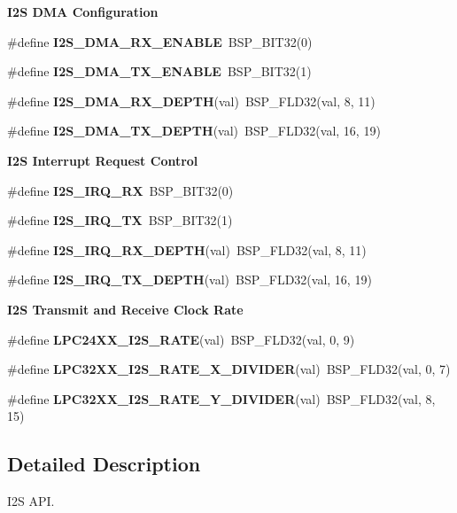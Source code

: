 \begin{Indent}\textbf{ I2S D\+MA Configuration}\par
\begin{DoxyCompactItemize}
\item 
\#define {\bfseries I2\+S\+\_\+\+D\+M\+A\+\_\+\+R\+X\+\_\+\+E\+N\+A\+B\+LE}~B\+S\+P\+\_\+\+B\+I\+T32(0)
\item 
\#define {\bfseries I2\+S\+\_\+\+D\+M\+A\+\_\+\+T\+X\+\_\+\+E\+N\+A\+B\+LE}~B\+S\+P\+\_\+\+B\+I\+T32(1)
\item 
\#define {\bfseries I2\+S\+\_\+\+D\+M\+A\+\_\+\+R\+X\+\_\+\+D\+E\+P\+TH}(val)~B\+S\+P\+\_\+\+F\+L\+D32(val, 8, 11)
\item 
\#define {\bfseries I2\+S\+\_\+\+D\+M\+A\+\_\+\+T\+X\+\_\+\+D\+E\+P\+TH}(val)~B\+S\+P\+\_\+\+F\+L\+D32(val, 16, 19)
\end{DoxyCompactItemize}
\end{Indent}
\begin{Indent}\textbf{ I2S Interrupt Request Control}\par
\begin{DoxyCompactItemize}
\item 
\#define {\bfseries I2\+S\+\_\+\+I\+R\+Q\+\_\+\+RX}~B\+S\+P\+\_\+\+B\+I\+T32(0)
\item 
\#define {\bfseries I2\+S\+\_\+\+I\+R\+Q\+\_\+\+TX}~B\+S\+P\+\_\+\+B\+I\+T32(1)
\item 
\#define {\bfseries I2\+S\+\_\+\+I\+R\+Q\+\_\+\+R\+X\+\_\+\+D\+E\+P\+TH}(val)~B\+S\+P\+\_\+\+F\+L\+D32(val, 8, 11)
\item 
\#define {\bfseries I2\+S\+\_\+\+I\+R\+Q\+\_\+\+T\+X\+\_\+\+D\+E\+P\+TH}(val)~B\+S\+P\+\_\+\+F\+L\+D32(val, 16, 19)
\end{DoxyCompactItemize}
\end{Indent}
\begin{Indent}\textbf{ I2S Transmit and Receive Clock Rate}\par
\begin{DoxyCompactItemize}
\item 
\#define {\bfseries L\+P\+C24\+X\+X\+\_\+\+I2\+S\+\_\+\+R\+A\+TE}(val)~B\+S\+P\+\_\+\+F\+L\+D32(val, 0, 9)
\item 
\#define {\bfseries L\+P\+C32\+X\+X\+\_\+\+I2\+S\+\_\+\+R\+A\+T\+E\+\_\+\+X\+\_\+\+D\+I\+V\+I\+D\+ER}(val)~B\+S\+P\+\_\+\+F\+L\+D32(val, 0, 7)
\item 
\#define {\bfseries L\+P\+C32\+X\+X\+\_\+\+I2\+S\+\_\+\+R\+A\+T\+E\+\_\+\+Y\+\_\+\+D\+I\+V\+I\+D\+ER}(val)~B\+S\+P\+\_\+\+F\+L\+D32(val, 8, 15)
\end{DoxyCompactItemize}
\end{Indent}


\subsection{Detailed Description}
I2S A\+PI. 

